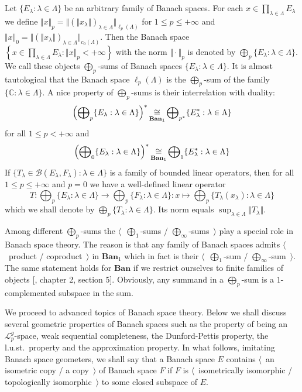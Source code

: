 Let $ \{E_\lambda:\lambda\in\Lambda \}$ be an arbitrary family of Banach spaces.
For each $x\in \prod_{\lambda\in\Lambda} E_\lambda$ we define 
$\Vert x\Vert_p
=\Vert{
  (\Vert x_\lambda\Vert)}_{\lambda\in\Lambda}
\Vert_{\ell_p(\Lambda)}$
for $1\leq p\leq +\infty$ and 
$\Vert x\Vert_0
=\Vert
  {(\Vert x_\lambda\Vert)}_{\lambda\in\Lambda}
\Vert_{c_0(\Lambda)}$. 
Then the Banach space
$\left \{
  x\in \prod_{\lambda\in\Lambda} E_\lambda
  :\Vert x\Vert_p<+\infty
\right \}$ 
with the norm $\Vert\cdot\Vert_p$ is denoted by $\bigoplus_p
\{E_\lambda:\lambda\in\Lambda \}$. We call these objects $\bigoplus_p$-sums of
Banach spaces $ \{E_\lambda:\lambda\in\Lambda \}$. It is almost tautological
that the Banach space $\ell_p(\Lambda)$ is the $\bigoplus_p$-sum of the family $
\{\mathbb{C}:\lambda\in\Lambda \}$. A nice property of $\bigoplus_p$-sums is
their interrelation with duality:
$$
{\left(\bigoplus\nolimits_p \{E_\lambda:\lambda\in\Lambda \}\right)}^*
\mathop{\mathbin{\cong}}\limits_{\mathbf{Ban}_1}
\bigoplus\nolimits_{p^*} \{E_\lambda^*:\lambda\in\Lambda \}
$$
for all $1\leq p<+\infty$ and 
$$
{\left(\bigoplus\nolimits_0 \{E_\lambda:\lambda\in\Lambda \}\right)}^*
\mathop{\mathbin{\cong}}\limits_{\mathbf{Ban}_1}
\bigoplus\nolimits_1 \{E_\lambda^*:\lambda\in\Lambda \}
$$
If $ \{T_\lambda\in\mathcal{B}(E_\lambda, F_\lambda):\lambda\in\Lambda \}$ is a
family of bounded linear operators, then for all $1\leq p\leq+\infty$ and $p=0$
we have a well-defined linear operator
$$
T:\bigoplus\nolimits_p \{E_\lambda:\lambda\in\Lambda \}
  \to 
\bigoplus\nolimits_p \{ F_\lambda:\lambda\in\Lambda \}
:x\mapsto \bigoplus\nolimits_p \{ T_\lambda(x_\lambda):\lambda\in\Lambda \}
$$
which we shall denote by $\bigoplus_p \{T_\lambda:\lambda\in\Lambda \}$. Its
norm equals $\sup_{\lambda\in\Lambda}\Vert T_\lambda\Vert$.

Among different $\bigoplus_p$-sums the $\langle$~$\bigoplus_1$-sums /
$\bigoplus_\infty$-sums~$\rangle$ play a special role in Banach space theory.
The reason is that any family of Banach spaces admits $\langle$~product /
coproduct~$\rangle$ in $\mathbf{Ban}_1$ which in fact is their
$\langle$~$\bigoplus_1$-sum / $\bigoplus_\infty$-sum~$\rangle$. The same
statement holds for $\mathbf{Ban}$ if we restrict ourselves to finite families
of objects [\cite{HelLectAndExOnFuncAn}, chapter 2, section 5]. Obviously, any 
summand in a $\bigoplus_p$-sum is a $1$-complemented subspace in the sum.

We proceed to advanced topics of Banach space theory. Below we shall discuss
several geometric properties of Banach spaces such as the property of being an
$\mathscr{L}_p^g$-space, weak sequential completeness, the Dunford-Pettis
property, the l.u.st.\ property and the approximation property. In what follows,
imitating Banach space geometers, we shall say that a Banach space $E$ contains
$\langle$~an isometric copy / a copy~$\rangle$ of Banach space $F$ if $F$ is
$\langle$~isometrically isomorphic / topologically isomorphic~$\rangle$ to some
closed subspace of $E$. 

